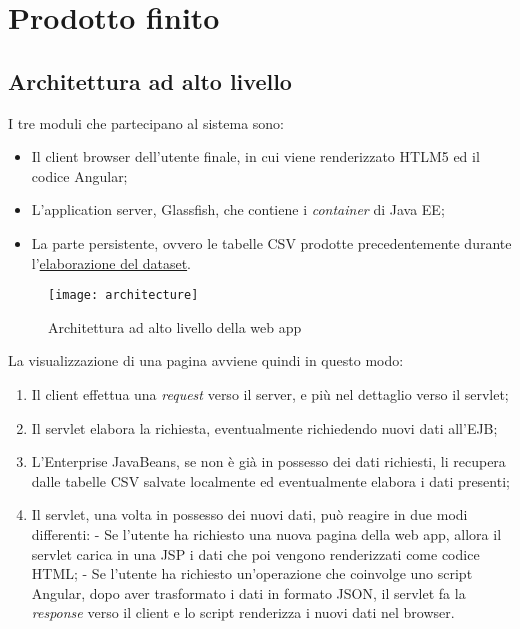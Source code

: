 \section{Prodotto finito}
\subsection{Architettura ad alto livello}
I tre moduli che partecipano al sistema sono:
\begin{itemize}
	\item Il client browser dell'utente finale, in cui viene renderizzato HTLM5 ed il codice Angular;
	\item L'application server, Glassfish, che contiene i \textit{container} di Java EE;
	\item La parte persistente, ovvero le tabelle \gls{CSV} prodotte precedentemente durante l'\hyperref[dataset]{elaborazione del dataset}.
\end{itemize} 

\begin{figure}[!h]
	\centering
	\texttt{[image: architecture]}
	\caption{Architettura ad alto livello della web app}
\end{figure}
\noindent La visualizzazione di una pagina avviene quindi in questo modo:
\begin{enumerate}
	\item Il client effettua una \textit{request} verso il server, e più nel dettaglio verso il servlet;
	\item Il servlet elabora la richiesta, eventualmente richiedendo nuovi dati all'EJB;
	\item L'Enterprise JavaBeans, se non è già in possesso dei dati richiesti, li recupera dalle tabelle \gls{CSV} salvate localmente ed eventualmente elabora i dati presenti;
	\item Il servlet, una volta in possesso dei nuovi dati, può reagire in due modi differenti:
	\subitem - Se l'utente ha richiesto una nuova pagina della \gls{web app}, allora il servlet carica in una JSP i dati che poi vengono renderizzati come codice HTML;
	\subitem - Se l'utente ha richiesto un'operazione che coinvolge uno script Angular, dopo aver trasformato i dati in formato \gls{JSON}, il servlet fa la \textit{response} verso il client e lo script renderizza i nuovi dati nel browser.
\end{enumerate}
\newpage
